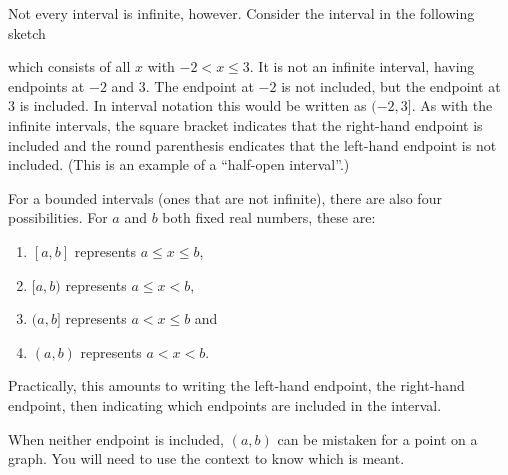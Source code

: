 \documentclass[nooutcomes]{ximera}
\begin{document}
	Not every interval is infinite, however. Consider the interval in the following sketch
	\begin{image}
	\end{image}
	which consists of all $x$ with $-2 < x \leq 3$. It is not an infinite interval, having endpoints at $-2$ and $3$. The endpoint at $-2$ is not included, but the endpoint at $3$ is included. In interval notation this would be written as $(-2, 3]$. As with the infinite intervals,
	the square bracket indicates that the right-hand endpoint is included and the round parenthesis endicates that the left-hand endpoint is not included. (This is an example of a ``half-open interval''.)

	For a bounded intervals (ones that are not infinite), there are also four possibilities. For $a$ and $b$ both fixed real numbers, these are:
	\begin{enumerate}
		\item $[a, b]$ represents $a \leq x \leq b$,
		\item $[a, b)$ represents $a \leq x < b$,
		\item $(a, b]$ represents $a < x \leq b$ and
		\item $(a, b)$ represents $a < x < b$.
	\end{enumerate}
	Practically, this amounts to writing the left-hand endpoint, the right-hand endpoint, then indicating which endpoints are included in the interval. 
	\begin{MM}
	When neither endpoint is included, $(a,b)$ can be mistaken for a point on a graph. You will need to use the context
	to know which is meant.
	\end{MM}
\end{document}
